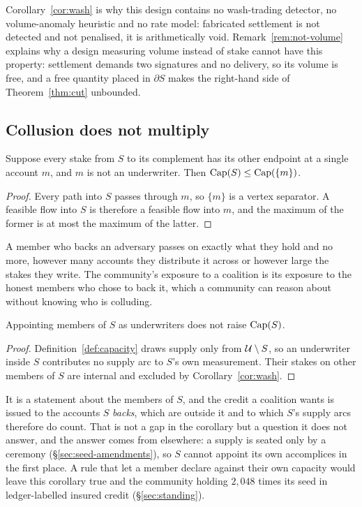 Corollary~\ref{cor:wash} is why this design contains no wash-trading detector, no
volume-anomaly heuristic and no rate model: fabricated settlement is not detected and not
penalised, it is arithmetically void. Remark~\ref{rem:not-volume} explains why a design
measuring volume instead of stake cannot have this property: settlement demands two
signatures and no delivery, so its volume is free, and a free quantity placed in
$\partial S$ makes the right-hand side of Theorem~\ref{thm:cut} unbounded.

\subsection{Collusion does not multiply}

\begin{corollary}
\label{cor:collusion}
Suppose every stake from $S$ to its complement has its other endpoint at a single
account $m$, and $m$ is not an underwriter. Then $\mathrm{Cap}(S) \le \mathrm{Cap}(\{m\})$.
\end{corollary}

\begin{proof}
Every path into $S$ passes through $m$, so $\{m\}$ is a vertex separator. A feasible flow
into $S$ is therefore a feasible flow into $m$, and the maximum of the former is at most
the maximum of the latter.
\end{proof}

A member who backs an adversary passes on exactly what they hold and no more, however
many accounts they distribute it across or however large the stakes they write. The
community's exposure to a coalition is its exposure to the honest members who chose to
back it, which a community can reason about without knowing who is colluding.

\begin{corollary}
\label{cor:self-uw}
Appointing members of $S$ as underwriters does not raise $\mathrm{Cap}(S)$.
\end{corollary}

\begin{proof}
Definition~\ref{def:capacity} draws supply only from $\mathcal{U}\setminus S$, so an underwriter
inside $S$ contributes no supply arc to $S$'s own measurement. Their stakes on other
members of $S$ are internal and excluded by Corollary~\ref{cor:wash}.
\end{proof}

\begin{remark}
\label{rem:self-uw-limits}
It is a statement about the members of $S$, and the credit a coalition wants is issued to
the accounts $S$ \emph{backs}, which are outside it and to which $S$'s supply arcs
therefore do count. That is not a gap in the corollary but a question it does not answer,
and the answer comes from elsewhere: a supply is seated only by a ceremony
(\S\ref{sec:seed-amendments}), so $S$ cannot appoint its own accomplices in the first
place. A rule that let a member declare against their own capacity would leave this
corollary true and the community holding $2{,}048$ times its seed in ledger-labelled
insured credit (\S\ref{sec:standing}).
\end{remark}

